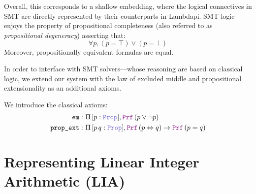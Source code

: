 Overall, this corresponds to a shallow embedding, where the logical connectives in SMT are directly represented by their counterparts in Lambdapi.
SMT logic enjoys the property of propositional completeness (also referred to as \emph{propositional degeneracy}) asserting that:
 \[
  \forall p,(p = \top) \lor (p = \bot)
\]
Moreover, propositionally equivalent formulas are equal.

In order to interface with SMT solvers—whose reasoning are based on classical logic,
we extend our system with the law of excluded middle and propositional extensionality as an additional axioms.


\begin{definition}
We introduce the classical axioms:
\begin{align*}
\texttt{em}:\ & \Pi\, [p: \prop], \prf\,(p \lor \neg p) \\
\texttt{prop\_ext}:\ & \Pi\, [p\,q: \prop], \prf\,(p \Leftrightarrow q ) \rightarrow \prf\,(p = q)
\end{align*}
\label{def:classical-facts}
\end{definition}

\section{Representing Linear Integer Arithmetic (\textbf{\uppercase{LIA}})}
\label{ssec:encoding-lia}

